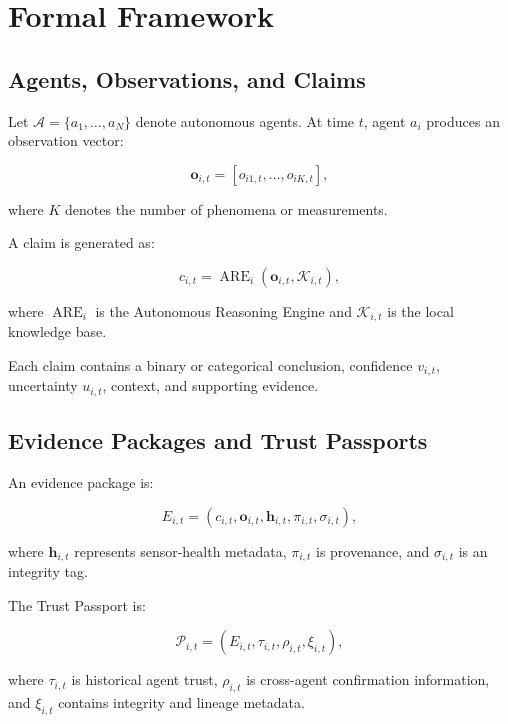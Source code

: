 \documentclass[10pt,conference]{IEEEtran}
\begin{document}
\section{Formal Framework}
\label{sec:framework}

\subsection{Agents, Observations, and Claims}

Let $\mathcal{A}=\{a_1,\ldots,a_N\}$ denote autonomous agents. At time $t$, agent $a_i$ produces an observation vector:

\begin{equation}
\mathbf{o}_{i,t} =
[o_{i1,t},\ldots,o_{iK,t}],
\end{equation}

where $K$ denotes the number of phenomena or measurements.

A claim is generated as:

\begin{equation}
c_{i,t} =
\operatorname{ARE}_i(\mathbf{o}_{i,t},\mathcal{K}_{i,t}),
\end{equation}

where $\operatorname{ARE}_i$ is the Autonomous Reasoning Engine and $\mathcal{K}_{i,t}$ is the local knowledge base.

Each claim contains a binary or categorical conclusion, confidence $v_{i,t}$, uncertainty $u_{i,t}$, context, and supporting evidence.

\subsection{Evidence Packages and Trust Passports}

An evidence package is:

\begin{equation}
E_{i,t} =
(c_{i,t},\mathbf{o}_{i,t},\mathbf{h}_{i,t},
\pi_{i,t},\sigma_{i,t}),
\end{equation}

where $\mathbf{h}_{i,t}$ represents sensor-health metadata, $\pi_{i,t}$ is provenance, and $\sigma_{i,t}$ is an integrity tag.

The Trust Passport is:

\begin{equation}
\mathcal{P}_{i,t} =
(E_{i,t},\tau_{i,t},\rho_{i,t},\xi_{i,t}),
\end{equation}

where $\tau_{i,t}$ is historical agent trust, $\rho_{i,t}$ is cross-agent confirmation information, and $\xi_{i,t}$ contains integrity and lineage metadata.
\end{document}
